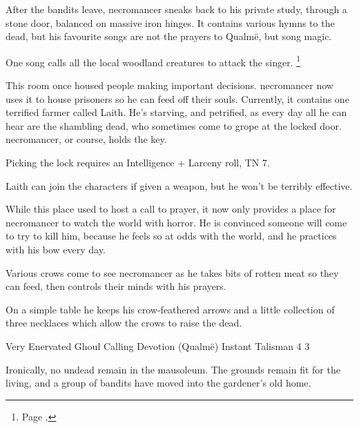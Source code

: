 \begin{multicols}{2}

After the bandits leave, \gls{necromancer} sneaks back to his private study, through a stone door, balanced on massive iron hinges.  It contains various hymns to the dead, but his favourite songs are not the prayers to Qualm\"{e}, but song magic.

One song calls all the local woodland creatures to attack the singer.%
\footnote{Page \pageref{medalofheroism}.}


This room once housed people making important decisions.  \Gls{necromancer} now uses it to house prisoners so he can feed off their souls.
Currently, it contains one terrified farmer called Laith.
He's starving, and petrified, as every day all he can hear are the shambling dead, who sometimes come to grope at the locked door.
\Gls{necromancer}, or course, holds the key.

Picking the lock requires an Intelligence + Larceny roll, TN 7.

Laith can join the characters if given a weapon, but he won't be terribly effective.



While this place used to host a call to prayer, it now only provides a place for \gls{necromancer} to watch the world with horror.  He is convinced someone will come to try to kill him, because he feels so at odds with the world, and he practices with his bow every day.

Various crows come to see \gls{necromancer} as he takes bits of rotten meat so they can feed, then controls their minds with his prayers.

On a simple table he keeps his crow-feathered arrows and a little collection of three necklaces which allow the crows to raise the dead.

%
  {Very Enervated Ghoul Calling}%
  {Devotion (Qualm\"{e})}%
  {Instant}%
  {Talisman}%
  {4}%
  {3}%
  \label{ghoulNecklace}

\thenecromancer



Ironically, no undead remain in the mausoleum.  The grounds remain fit for the living, and a group of bandits have moved into the gardener's old home.


\end{multicols}
